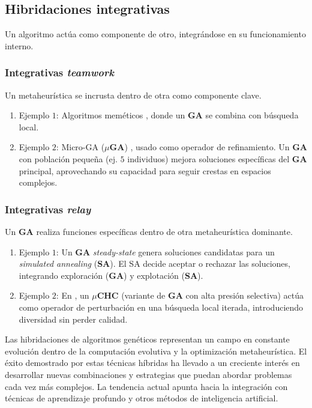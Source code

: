 \documentclass[12pt,letterpaper]{article}
\begin{document}
\subsection{Hibridaciones integrativas}
Un algoritmo actúa como componente de otro, integrándose en su funcionamiento interno.

\subsubsection{Integrativas \textit{teamwork}}
Un metaheurística se incrusta dentro de otra como componente clave.
\begin{enumerate}
    \item Ejemplo $1$: Algoritmos meméticos \cite{memetics}, donde un \textbf{GA} se combina con búsqueda local.
    \item Ejemplo $2$: Micro-GA ($\mu$\textbf{GA}) \cite{930311}, usado como operador de refinamiento. Un \textbf{GA} con población pequeña (ej. $5$ individuos) mejora soluciones específicas del \textbf{GA} principal, aprovechando su capacidad para seguir crestas en espacios complejos.
\end{enumerate}

\subsubsection{Integrativas \textit{relay}}
Un \textbf{GA} realiza funciones específicas dentro de otra metaheurística dominante.

\begin{enumerate}
    \item Ejemplo $1$: Un \textbf{GA} \textit{steady-state} genera soluciones candidatas para un \textit{simulated annealing} (\textbf{SA}). El SA decide aceptar o rechazar las soluciones, integrando exploración (\textbf{GA}) y explotación (\textbf{SA}).
    \item Ejemplo $2$: En \cite{microchc}, un $\mu$\textbf{CHC} (variante de \textbf{GA} con alta presión selectiva) actúa como operador de perturbación en una búsqueda local iterada, introduciendo diversidad sin perder calidad.
\end{enumerate}

Las hibridaciones de algoritmos genéticos representan un campo en constante evolución dentro de la computación evolutiva y la optimización metaheurística. El éxito demostrado por estas técnicas híbridas ha llevado a un creciente interés en desarrollar nuevas combinaciones y estrategias que puedan abordar problemas cada vez más complejos. La tendencia actual apunta hacia la integración con técnicas de aprendizaje profundo y otros métodos de inteligencia artificial.
\end{document}
